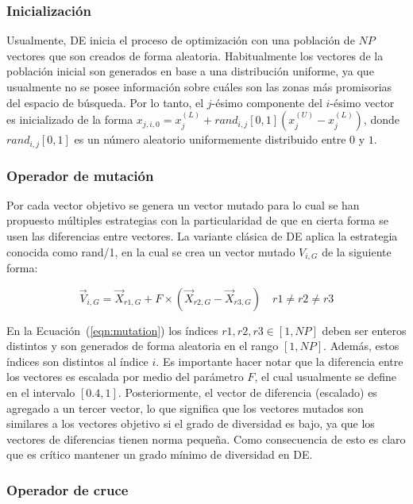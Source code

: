 \documentclass[preprint,12pt]{elsarticle}
\begin{document}
\subsubsection{Inicializaci\'on}

Usualmente, DE inicia el proceso de optimización con una población de $NP$ vectores que son creados de forma aleatoria.
%
Habitualmente los vectores de la población inicial son generados en base a una distribución uniforme, ya que usualmente no se posee información sobre cuáles son las zonas más promisorias del espacio de búsqueda.
%
Por lo tanto, el $j$-ésimo componente del $i$-ésimo vector es inicializado de la forma $x_{j,i,0} = x_{j}^{(L)} + rand_{i,j}[0,1] (x_{j}^{(U)} - x_{j}^{(L)})$,
donde $rand_{i,j}[0,1]$ es un número aleatorio uniformemente distribuido entre $0$ y $1$.

\subsubsection{Operador de mutaci\'on}

Por cada vector objetivo se genera un vector mutado para lo cual se han propuesto múltiples estrategias con la particularidad de que en cierta forma
se usen las diferencias entre vectores.
%
La variante clásica de DE aplica la estrategia conocida como rand/1, en la cual se crea un vector mutado $V_{i,G}$ de la siguiente forma:

\begin{equation}\label{eqn:mutation}
\vec{V}_{i,G} = \vec{X}_{r1, G} + F \times (\vec{X}_{r2, G} - \vec{X}_{r3, G}) \quad r1 \neq r2 \neq r3
\end{equation}

En la Ecuación~(\ref{eqn:mutation}) los índices $r1, r2, r3 \in [1,NP]$ deben ser enteros distintos y son generados de forma aleatoria
en el rango $[1, NP]$.
%
Además, estos índices son distintos al índice $i$.
%
Es importante hacer notar que la diferencia entre los vectores es escalada por medio del parámetro $F$, el cual usualmente se define en el intervalo $[0.4, 1]$.
%
Posteriormente, el vector de diferencia (escalado) es agregado a un tercer vector, lo que significa que los vectores mutados son similares a los vectores objetivo si el grado de diversidad es bajo, ya que los vectores de diferencias tienen norma pequeña.
%
Como consecuencia de esto es claro que es crítico mantener un grado mínimo de diversidad en DE.

\subsubsection{Operador de cruce}
\end{document}

